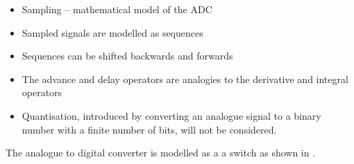 \begin{slide}\label{slide:l7s2a}
  \begin{itemize}
   \item Sampling -- mathematical model of the ADC
   \item Sampled signals are modelled as sequences
   \item Sequences can be shifted backwards and forwards
   \item The advance and delay operators are analogies to the derivative
     and integral operators
  \end{itemize}
\end{slide}

\begin{slide}\label{slide:l7s2}
  \begin{itemize}
   \item Quantisation, introduced by converting an analogue signal to a
     binary number with a finite number of bits, will not be considered. 
  \end{itemize}
\end{slide}


The analogue to digital converter is modelled as a a switch as
shown in . 

\ifslidesonly
\begin{slide}

\end{slide}
\fi


\ifslidesonly
\begin{slide}

\end{slide}
\fi


\begin{slide}\label{slide:l7s3}
\end{slide}

